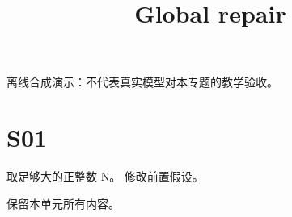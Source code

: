 \documentclass[UTF8,fontset=fandol,11pt]{ctexart}
\title{Global repair}
\date{}
\begin{document}
\maketitle
\par\noindent 离线合成演示：不代表真实模型对本专题的教学验收。\par
\section{S01}\label{sec:S01}
取足够大的正整数 N。 修改前置假设。\par
保留本单元所有内容。\par
\end{document}
